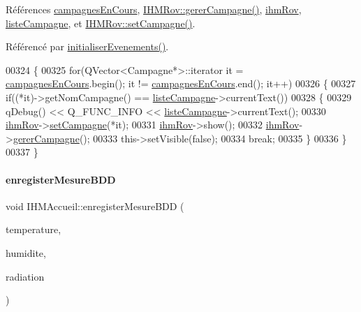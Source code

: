 Références \hyperlink{ihmaccueil_8h_source_l00039}{campagnes\+En\+Cours}, \hyperlink{ihmrov_8cpp_source_l00202}{I\+H\+M\+Rov\+::gerer\+Campagne()}, \hyperlink{ihmaccueil_8h_source_l00041}{ihm\+Rov}, \hyperlink{ihmaccueil_8h_source_l00037}{liste\+Campagne}, et \hyperlink{ihmrov_8cpp_source_l00143}{I\+H\+M\+Rov\+::set\+Campagne()}.



Référencé par \hyperlink{ihmaccueil_8cpp_source_l00084}{initialiser\+Evenements()}.


\begin{DoxyCode}
00324 \{
00325     \textcolor{keywordflow}{for}(QVector<Campagne*>::iterator it = \hyperlink{class_i_h_m_accueil_ad3827b81480eb201b5927c16a2ad1c46}{campagnesEnCours}.begin(); it != 
      \hyperlink{class_i_h_m_accueil_ad3827b81480eb201b5927c16a2ad1c46}{campagnesEnCours}.end(); it++)
00326     \{
00327         \textcolor{keywordflow}{if}((*it)->getNomCampagne() == \hyperlink{class_i_h_m_accueil_afb828a4e06c25afa40341c310cd85b08}{listeCampagne}->currentText())
00328         \{
00329             qDebug() << Q\_FUNC\_INFO << \hyperlink{class_i_h_m_accueil_afb828a4e06c25afa40341c310cd85b08}{listeCampagne}->currentText();
00330             \hyperlink{class_i_h_m_accueil_af9f2613056b21bdf82e8f54a26146acc}{ihmRov}->\hyperlink{class_i_h_m_rov_a301a0b8cb323c2c9de71df9070bb7555}{setCampagne}(*it);
00331             \hyperlink{class_i_h_m_accueil_af9f2613056b21bdf82e8f54a26146acc}{ihmRov}->show();
00332             \hyperlink{class_i_h_m_accueil_af9f2613056b21bdf82e8f54a26146acc}{ihmRov}->\hyperlink{class_i_h_m_rov_a3660d3b4bf61367534eae9d0c3618a5e}{gererCampagne}();
00333             this->setVisible(\textcolor{keyword}{false});
00334             \textcolor{keywordflow}{break};
00335         \}
00336     \}    
00337 \}
\end{DoxyCode}
\mbox{\label{class_i_h_m_accueil_af61976178829ec1fc756bec7eff0354d}} 
\paragraph{\texorpdfstring{enregister\+Mesure\+B\+DD}{enregisterMesureBDD}}
{\footnotesize\ttfamily void I\+H\+M\+Accueil\+::enregister\+Mesure\+B\+DD (\begin{DoxyParamCaption}\item[{Q\+String}]{temperature,  }\item[{Q\+String}]{humidite,  }\item[{Q\+String}]{radiation }\end{DoxyParamCaption})\hspace{0.3cm}{\ttfamily [slot]}}



